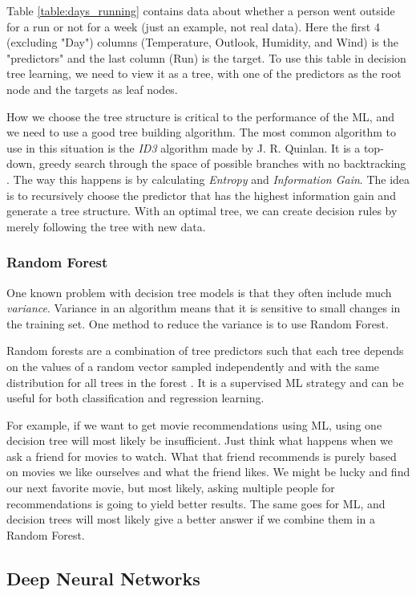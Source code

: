Table \ref{table:days_running} contains data about whether a person went outside for a run or not for a week (just an example, not real data). 
Here the first 4 (excluding "Day") columns (Temperature, Outlook, Humidity, and Wind) is the "predictors" and the last column (Run) is the target. 
To use this table in decision tree learning, we need to view it as a tree, with one of the predictors as the root node and the targets as leaf nodes. 

How we choose the tree structure is critical to the performance of the ML, and we need to use a good tree building algorithm. 
The most common algorithm to use in this situation is the \textit{ID3} algorithm made by J. R. Quinlan. It is a top-down, greedy search through the space 
of possible branches with no backtracking \cite{decision_tree}. The way this happens is by calculating \textit{Entropy} and \textit{Information Gain}. 
The idea is to recursively choose the predictor that has the highest information gain and generate a tree structure. With an optimal tree, 
we can create decision rules by merely following the tree with new data.

\subsubsection{Random Forest}
One known problem with decision tree models is that they often include much \textit{variance}. Variance in an algorithm means that it is sensitive to small 
changes in the training set. One method to reduce the variance is to use Random Forest. 

Random forests are a combination of tree predictors such that each tree depends on the values of a
random vector sampled independently and with the same distribution for all trees in the forest \cite{random_forest}. 
It is a supervised ML strategy and can be useful for both classification and regression learning.

For example, if we want to get movie recommendations using ML, using one decision tree will most likely be insufficient. 
Just think what happens when we ask a friend for movies to watch. What that friend recommends is purely based on movies we like ourselves and what the friend likes. 
We might be lucky and find our next favorite movie, but most likely, asking multiple people for recommendations is going to yield better results. 
The same goes for ML, and decision trees will most likely give a better answer if we combine them in a Random Forest.

\subsection{Deep Neural Networks}


